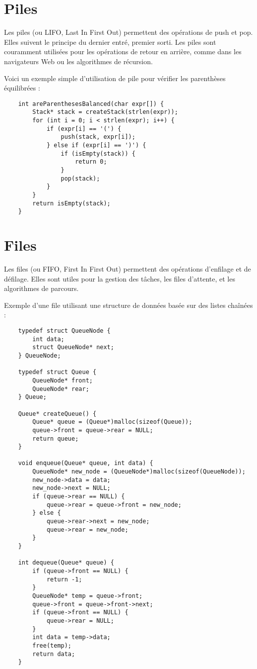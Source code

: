 \section{Piles}
Les piles (ou LIFO, Last In First Out) permettent des opérations de push et pop. Elles suivent le principe du dernier entré, premier sorti. Les piles sont couramment utilisées pour les opérations de retour en arrière, comme dans les navigateurs Web ou les algorithmes de récursion.

Voici un exemple simple d'utilisation de pile pour vérifier les parenthèses équilibrées :

\begin{lstlisting}
	int areParenthesesBalanced(char expr[]) {
		Stack* stack = createStack(strlen(expr));
		for (int i = 0; i < strlen(expr); i++) {
			if (expr[i] == '(') {
				push(stack, expr[i]);
			} else if (expr[i] == ')') {
				if (isEmpty(stack)) {
					return 0;
				}
				pop(stack);
			}
		}
		return isEmpty(stack);
	}
\end{lstlisting}

\section{Files}
Les files (ou FIFO, First In First Out) permettent des opérations d'enfilage et de défilage. Elles sont utiles pour la gestion des tâches, les files d'attente, et les algorithmes de parcours.

Exemple d'une file utilisant une structure de données basée sur des listes chaînées :

\begin{lstlisting}
	typedef struct QueueNode {
		int data;
		struct QueueNode* next;
	} QueueNode;
	
	typedef struct Queue {
		QueueNode* front;
		QueueNode* rear;
	} Queue;
	
	Queue* createQueue() {
		Queue* queue = (Queue*)malloc(sizeof(Queue));
		queue->front = queue->rear = NULL;
		return queue;
	}
	
	void enqueue(Queue* queue, int data) {
		QueueNode* new_node = (QueueNode*)malloc(sizeof(QueueNode));
		new_node->data = data;
		new_node->next = NULL;
		if (queue->rear == NULL) {
			queue->rear = queue->front = new_node;
		} else {
			queue->rear->next = new_node;
			queue->rear = new_node;
		}
	}
	
	int dequeue(Queue* queue) {
		if (queue->front == NULL) {
			return -1;
		}
		QueueNode* temp = queue->front;
		queue->front = queue->front->next;
		if (queue->front == NULL) {
			queue->rear = NULL;
		}
		int data = temp->data;
		free(temp);
		return data;
	}
\end{lstlisting}

